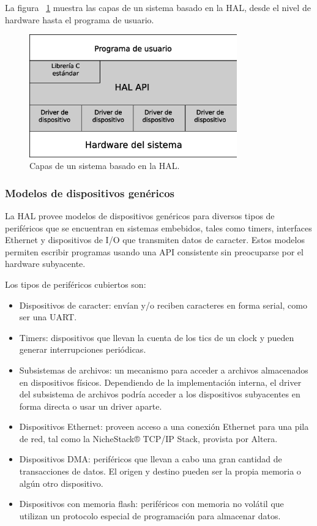 La figura ~\ref{fig:hal} muestra las capas de un sistema basado en la HAL, desde el nivel de hardware hasta el programa de usuario.

\begin{figure}[H]
  \centering
	\includegraphics[width=0.80\textwidth]{3-arquitectura/graf/hal.eps}
  \caption{Capas de un sistema basado en la HAL.}
  \label{fig:hal}
\end{figure}

\subsubsection*{Modelos de dispositivos genéricos}

La HAL provee modelos de dispositivos genéricos para diversos tipos de periféricos que se encuentran en sistemas embebidos, tales como timers, interfaces Ethernet y dispositivos de I/O que transmiten datos de caracter. Estos modelos permiten escribir programas usando una API consistente sin preocuparse por el hardware subyacente.

Los tipos de periféricos cubiertos son:

\begin{itemize}
	\item Dispositivos de caracter: envían y/o reciben caracteres en forma serial, como ser una UART.
	\item Timers: dispositivos que llevan la cuenta de los tics de un clock y pueden generar interrupciones periódicas.
	\item Subsistemas de archivos: un mecanismo para acceder a archivos almacenados en dispositivos físicos. Dependiendo de la implementación interna, el driver del subsistema de archivos podría acceder a los dispositivos subyacentes en forma directa o usar un driver aparte.
	\item Dispositivos Ethernet: proveen acceso a una conexión Ethernet para una pila de red, tal como la NicheStack® TCP/IP Stack, provista por Altera.
	\item Dispositivos DMA: periféricos que llevan a cabo una gran cantidad de transacciones de datos. El origen y destino pueden ser la propia memoria o algún otro dispositivo.
	\item Dispositivos con memoria flash: periféricos con memoria no volátil que utilizan un protocolo especial de programación para almacenar datos.
\end{itemize}

